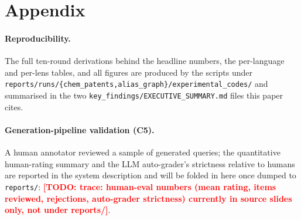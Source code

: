 \documentclass[11pt]{article}
\newcommand{\todo}[1]{\textcolor{red}{\textbf{[TODO: #1]}}}
\begin{document}


\appendix
\section{Appendix}

\paragraph{Reproducibility.}
The full ten-round derivations behind the headline numbers, the per-language and
per-lens tables, and all figures are produced by the scripts under
\texttt{reports/runs/\{chem\_patents,alias\_graph\}/experimental\_codes/} and
summarised in the two \texttt{key\_findings/EXECUTIVE\_SUMMARY.md} files this
paper cites.

\paragraph{Generation-pipeline validation (C5).}
A human annotator reviewed a sample of generated queries; the quantitative
human-rating summary and the LLM auto-grader's strictness relative to humans are
reported in the system description and will be folded in here once dumped to
\texttt{reports/}:
\todo{trace: human-eval numbers (mean rating, items reviewed, rejections,
auto-grader strictness) currently in source slides only, not under reports/}.
\end{document}
